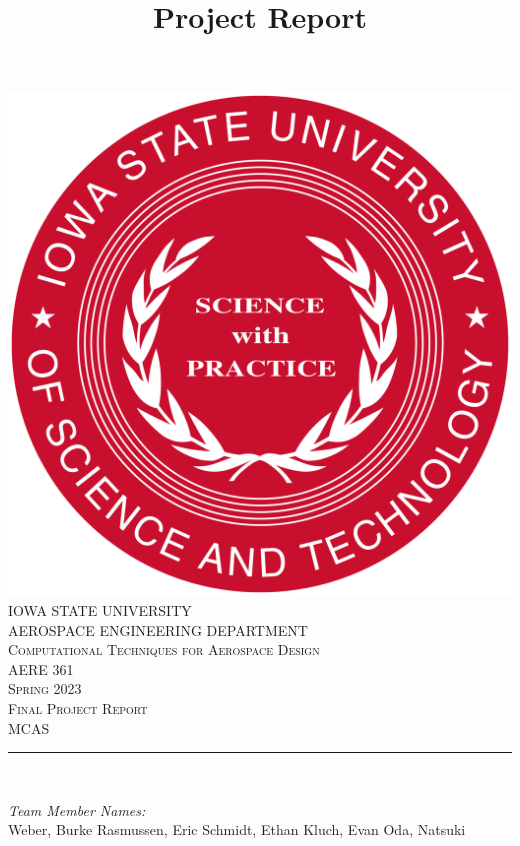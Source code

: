 \documentclass[12pt]{article}
\begin{document}
\title{Project Report}

\begin{titlepage}
	\centering
    \vspace*{0.5 cm}
    \includegraphics[scale = 0.11]{isu_seal.png}\\[1.0 cm]	%
    \textsc{\LARGE IOWA STATE UNIVERSITY}\\[2.0 cm]
    \textsc{\large AEROSPACE ENGINEERING DEPARTMENT}\\[0.2 cm]
    \textsc{\large Computational Techniques for Aerospace Design}\\[0.2 cm]
	\textsc{\Large AERE 361}\\[0.5 cm]				%
	\textsc{\Large Spring 2023}\\[0.5 cm]				%
	\textsc{\Large Final Project Report}\\[0.2 cm]
	\textsc{\Large MCAS}\\[0.2 cm]
	\rule{\linewidth}{0.2 mm} \\[0.4 cm]
	
	
	\begin{minipage}{0.8\textwidth}
		
			\begin{flushleft} 
			\emph{Team Member Names:} \\
			Weber, Burke\linebreak
			Rasmussen, Eric\linebreak
			Schmidt, Ethan\linebreak
			Kluch, Evan\linebreak
			Oda, Natsuki\linebreak
			

\end{flushleft}
\end{minipage}
\end{titlepage}
\end{document}
